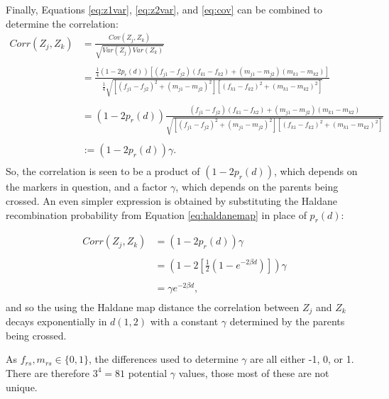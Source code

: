 \documentclass{article}
\begin{document}
Finally, Equations \ref{eq:z1var}, \ref{eq:z2var}, and \ref{eq:cov} can be combined to determine the correlation:
\begin{equation} \label{eq:precorr}
  \begin{split}
    Corr(Z_j, Z_k) & = \frac{Cov(Z_j, Z_k)}{\sqrt{Var(Z_j) Var(Z_k)}}\\
    & \\
    & = \frac{ \frac{1}{4} (1 - 2 p_r(d)) \left [ (f_{j1} - f_{j2})(f_{k1} - f_{k2}) + (m_{j1} - m_{j2})(m_{k1} - m_{k2}) \right ] }{ \frac{1}{4} \sqrt{ \left [ (f_{j1} - f_{j2})^2 + (m_{j1} - m_{j2})^2 \right ] \left [ (f_{k1} - f_{k2})^2 + (m_{k1} - m_{k2})^2 \right ] }} \\
    & \\
    & = (1 - 2 p_r(d)) \frac{ (f_{j1} - f_{j2})(f_{k1} - f_{k2}) + (m_{j1} - m_{j2})(m_{k1} - m_{k2}) }{ \sqrt{ \left [ (f_{j1} - f_{j2})^2 + (m_{j1} - m_{j2})^2 \right ] \left [ (f_{k1} - f_{k2})^2 + (m_{k1} - m_{k2})^2 \right ] }} \\
    & \\
    & := (1 - 2 p_r(d)) \gamma .\\
  \end{split}
\end{equation}
So, the correlation is seen to be a product of $(1-2 p_r(d))$, which depends on the markers in question, and a factor $\gamma$, which depends on the parents being crossed. An even simpler expression is obtained by substituting the Haldane recombination probability from Equation \ref{eq:haldanemap} in place of $p_r(d)$:

\begin{equation} \label{eq:corrdist}
  \begin{split}
    Corr(Z_j, Z_k) & = (1 - 2 p_r(d)) \gamma \\
    & \\
    & = \left ( 1 - 2 \left [ \frac{1}{2} \left ( 1 - e^{-2 \beta d} \right ) \right ] \right ) \gamma \\
    & \\
    & = \gamma e^{-2 \beta d}, \\
  \end{split}
\end{equation}
and so the using the Haldane map distance the correlation between $Z_j$ and $Z_k$ decays exponentially in $d(1,2)$ with a constant $\gamma$ determined by the parents being crossed.

As $f_{rs}, m_{rs} \in \{0, 1\}$, the differences used to determine $\gamma$ are all either -1, 0, or 1. There are therefore $3^4 = 81$ potential $\gamma$ values, those most of these are not unique.
\end{document}
